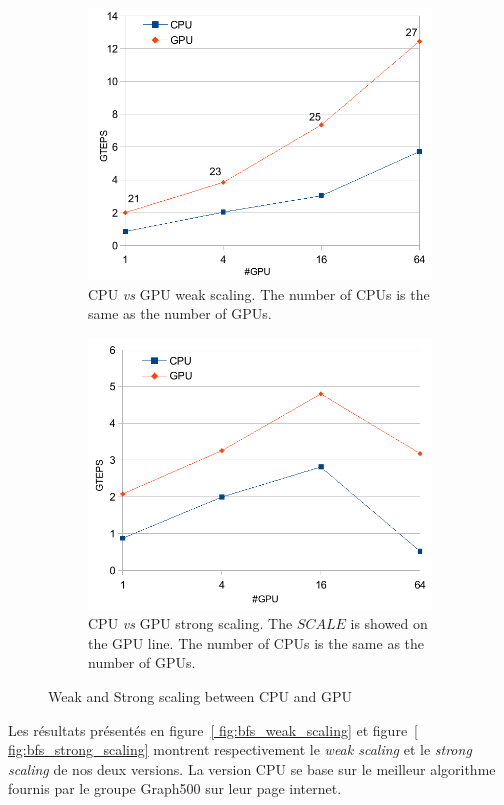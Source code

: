 \documentclass[12pt,a4paper]{report}
\begin{document}
\begin{figure}[htb]
\begin{subfigure}[t]{0.48\linewidth}
\centering
\includegraphics[width=1\linewidth]{../figures/graph500/weak_scaling}
\caption[]{CPU \textit{vs} GPU weak scaling. The number of CPUs is the same as the number of GPUs.}
\label{fig:bfs_weak_scaling}
\end{subfigure}
\hfill
\begin{subfigure}[t]{0.48\linewidth}
\centering
\includegraphics[width=1\linewidth]{../figures/graph500/strong_scaling}
\caption[]{CPU \textit{vs} GPU strong scaling. The $SCALE$ is showed on the GPU line. The number of CPUs is the same as the number of GPUs.}
\label{fig:bfs_strong_scaling}
\end{subfigure}
\caption{Weak and Strong scaling between CPU and GPU}
\end{figure}
Les résultats présentés en figure~\ref{ fig:bfs_weak_scaling} et figure~\ref{ fig:bfs_strong_scaling} montrent respectivement le \textit{weak scaling} et le \textit{strong scaling} de nos deux versions. 
La version CPU se base sur le meilleur algorithme fournis par le groupe Graph500 sur leur page internet. 
\end{document}
